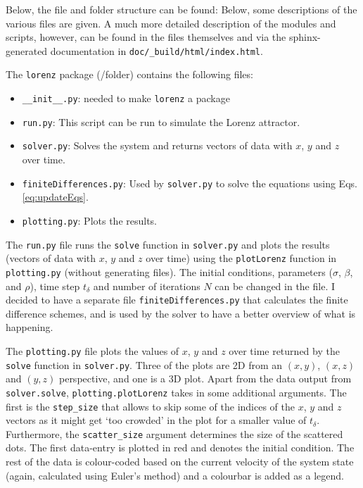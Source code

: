 \documentclass{article}
\def\td{t_\delta}
\def\code#1{\texttt{#1}}
\begin{document}
Below, the file and folder structure can be found:
\vspace{2em}
\noindent 
Below, some descriptions of the various files are given. A much more detailed description of the modules and scripts, however, can be found in the files themselves and via the sphinx-generated documentation in \code{doc/\_build/html/index.html}.

The \code{lorenz} package (/folder) contains the following files:
\begin{itemize}
    \item \code{\_\_init\_\_.py}: needed to make \code{lorenz} a package
    \item \code{run.py}: This script can be run to simulate the Lorenz attractor.  
    \item \code{solver.py}: Solves the system and returns vectors of data with $x$, $y$ and $z$ over time.
    \item \code{finiteDifferences.py}: Used by \code{solver.py} to solve the equations using Eqs. \eqref{eq:updateEqs}.  
    \item \code{plotting.py}: Plots the results. 
\end{itemize}
\vspace{1em}
The \code{run.py} file runs the \code{solve} function in \code{solver.py} and plots the results (vectors of data with $x$, $y$ and $z$ over time) using the \code{plotLorenz} function in \code{plotting.py} (without generating files). The initial conditions, parameters ($\sigma$, $\beta$, and $\rho$), time step $\td$ and number of iterations $N$ can be changed in the file. I decided to have a separate file \code{finiteDifferences.py} that calculates the finite difference schemes, and is used by the solver to have a better overview of what is happening.

The \code{plotting.py} file plots the values of $x$, $y$ and $z$ over time returned by the \code{solve} function in \code{solver.py}. Three of the plots are 2D from an $(x,y)$, $(x,z)$ and $(y,z)$ perspective, and one is a 3D plot. Apart from the data output from \code{solver.solve}, \code{plotting.plotLorenz} takes in some additional arguments. The first is the \code{step\_size} that allows to skip some of the indices of the $x$, $y$ and $z$ vectors as it might get `too crowded' in the plot for a smaller value of $\td$. Furthermore, the \code{scatter\_size} argument determines the size of the scattered dots. The first data-entry is plotted in red and denotes the initial condition. The rest of the data is colour-coded based on the current velocity of the system state (again, calculated using Euler's method) and a colourbar is added as a legend. 
\end{document}
